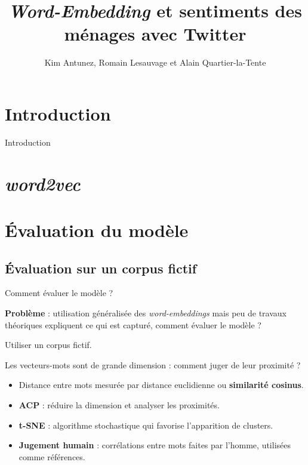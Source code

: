 \documentclass[10pt,xcolor=table,color={dvipsnames,usenames},ignorenonframetext,usepdftitle=false,french]{beamer}
\title{\emph{Word-Embedding} et sentiments des ménages avec Twitter}
\author{Kim Antunez, Romain Lesauvage et Alain Quartier-la-Tente}
\date{}
\begin{document}
\begin{frame}
\titlepage
\end{frame}

\section{Introduction}\label{introduction}

\begin{frame}{Introduction}

\resizebox{\textwidth}{!}{}

\end{frame}

\section{\texorpdfstring{\emph{word2vec}}{word2vec}}\label{word2vec}

\section{Évaluation du modèle}\label{uxe9valuation-du-moduxe8le}

\subsection{Évaluation sur un corpus
fictif}\label{uxe9valuation-sur-un-corpus-fictif}

\begin{frame}{Comment évaluer le modèle ?}

\textbf{Problème} : utilisation généralisée des \emph{word-embeddings}
mais peu de travaux théoriques expliquent ce qui est capturé, comment
évaluer le modèle ?

\faArrowCircleRight{} Utiliser un corpus fictif.

Les vecteurs-mots sont de grande dimension : comment juger de leur
proximité ?

\begin{itemize}
\item
  Distance entre mots mesurée par distance euclidienne ou
  \textbf{similarité cosinus}.
\item
  \textbf{ACP} : réduire la dimension et analyser les proximités.
\item
  \textbf{t-SNE} : algorithme stochastique qui favorise l'apparition de
  clusters.
\item
  \textbf{Jugement humain} : corrélations entre mots faites par l'homme,
  utilisées comme références.
\end{itemize}

\end{frame}
\end{document}
